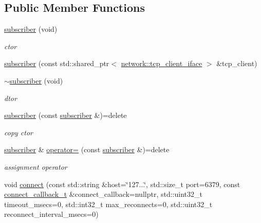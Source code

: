 \subsection*{Public Member Functions}
\begin{DoxyCompactItemize}
\item 
\hyperlink{classcpp__redis_1_1subscriber_ab7feafca57399394e3a1a0d6daf52770}{subscriber} (void)
\begin{DoxyCompactList}\small\item\em ctor \end{DoxyCompactList}\item 
\hyperlink{classcpp__redis_1_1subscriber_a66136601f44564842e2c67de2da199af}{subscriber} (const std\+::shared\+\_\+ptr$<$ \hyperlink{classcpp__redis_1_1network_1_1tcp__client__iface}{network\+::tcp\+\_\+client\+\_\+iface} $>$ \&tcp\+\_\+client)
\item 
\hyperlink{classcpp__redis_1_1subscriber_a878caeb144b11de30466a380b09abc30}{$\sim$subscriber} (void)
\begin{DoxyCompactList}\small\item\em dtor \end{DoxyCompactList}\item 
\hyperlink{classcpp__redis_1_1subscriber_af5f11532bf727eeb2d4a926bdc775cd7}{subscriber} (const \hyperlink{classcpp__redis_1_1subscriber}{subscriber} \&)=delete
\begin{DoxyCompactList}\small\item\em copy ctor \end{DoxyCompactList}\item 
\hyperlink{classcpp__redis_1_1subscriber}{subscriber} \& \hyperlink{classcpp__redis_1_1subscriber_ac60f83e6e915073bda6853baaeb39485}{operator=} (const \hyperlink{classcpp__redis_1_1subscriber}{subscriber} \&)=delete
\begin{DoxyCompactList}\small\item\em assignment operator \end{DoxyCompactList}\item 
void \hyperlink{classcpp__redis_1_1subscriber_a6ae8134a9a9b31d6f2434ec4f6e86d3a}{connect} (const std\+::string \&host=\char`\"{}127...\char`\"{}, std\+::size\+\_\+t port=6379, const \hyperlink{classcpp__redis_1_1subscriber_a90f2f7d4c748c3c2e89d1e977fa6dce1}{connect\+\_\+callback\+\_\+t} \&connect\+\_\+callback=nullptr, std\+::uint32\+\_\+t timeout\+\_\+msecs=0, std\+::int32\+\_\+t max\+\_\+reconnects=0, std\+::uint32\+\_\+t reconnect\+\_\+interval\+\_\+msecs=0)
\item 

\end{DoxyCompactItemize}
